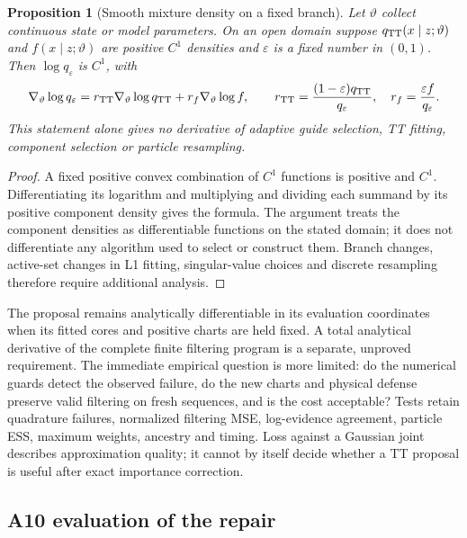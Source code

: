 \documentclass[11pt]{article}
\newtheorem{proposition}{Proposition}
\begin{document}
\begin{proposition}[Smooth mixture density on a fixed branch]
\label{prop:robust-smoothness}
Let $\vartheta$ collect continuous state or model parameters. On an open
domain suppose $q_{\rm TT}(x\mid z;\vartheta)$ and
$f(x\mid z;\vartheta)$ are positive $C^1$ densities and $\varepsilon$
is a fixed number in $(0,1)$. Then $\log q_\varepsilon$ is $C^1$, with
\begin{equation}
 \nabla_\vartheta\log q_\varepsilon
 =r_{\rm TT}\nabla_\vartheta\log q_{\rm TT}
   +r_f\nabla_\vartheta\log f,\qquad
 r_{\rm TT}=\frac{(1-\varepsilon)q_{\rm TT}}{q_\varepsilon},
 \quad r_f=\frac{\varepsilon f}{q_\varepsilon}.
 \label{eq:robust-mixture-score}
\end{equation}
This statement alone gives no derivative of adaptive guide selection,
TT fitting, component selection or particle resampling.
\end{proposition}
\begin{proof}
A fixed positive convex combination of $C^1$ functions is positive and
$C^1$. Differentiating its logarithm and multiplying and dividing each
summand by its positive component density gives the formula. The argument
treats the component densities as differentiable functions on the stated
domain; it does not differentiate any algorithm used to select or construct
them. Branch changes, active-set changes in L1 fitting, singular-value
choices and discrete resampling therefore require additional analysis.
\end{proof}

The proposal remains analytically differentiable in its evaluation
coordinates when its fitted cores and positive charts are held fixed. A
total analytical derivative of the complete finite filtering program is a
separate, unproved requirement. The immediate empirical question is more
limited: do the numerical guards detect the observed failure, do the new
charts and physical defense preserve valid filtering on fresh sequences,
and is the cost acceptable? Tests retain quadrature failures, normalized
filtering MSE, log-evidence agreement, particle ESS, maximum weights,
ancestry and timing. Loss against a Gaussian joint describes approximation
quality; it cannot by itself decide whether a TT proposal is useful after
exact importance correction.

\subsection{A10 evaluation of the repair}
\end{document}
